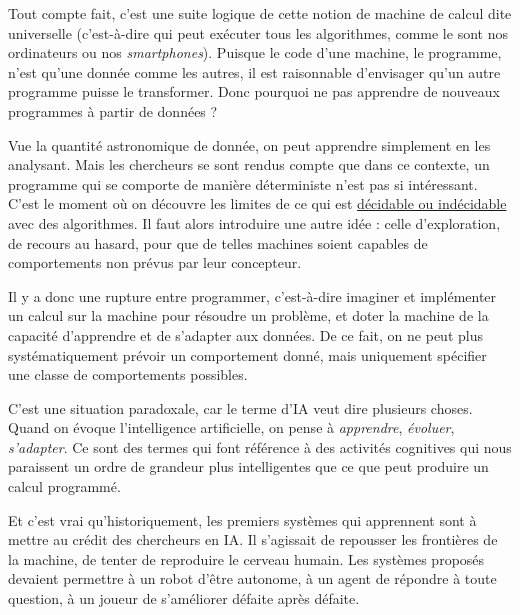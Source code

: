 %
Tout compte fait, c’est une suite logique de cette notion de machine de calcul dite universelle (c’est-à-dire qui peut exécuter tous les algorithmes, comme le sont nos ordinateurs ou nos \textit{smartphones}). Puisque le code d’une machine, le programme, n’est qu’une donnée comme les autres, il est raisonnable d’envisager qu’un autre programme puisse le transformer. Donc pourquoi ne pas apprendre de nouveaux program\-mes à partir de données ?

Vue la quantité astronomique de donnée, on peut apprendre simplement en les analysant. Mais les chercheurs se sont rendus compte que dans ce contexte, un programme qui se comporte de manière déterministe n’est pas si intéressant. C’est le moment où on découvre les limites de ce qui est \href{https://www.lemonde.fr/blog/binaire/2015/06/17/decidable-indecidable/}{décidable ou indécidable} avec des algorithmes. Il faut alors introduire une autre idée : celle d’exploration, de recours au hasard, pour que de telles machines soient capables de comportements non prévus par leur concepteur.

Il y a donc une rupture entre programmer, c’est-à-dire imaginer et implémenter un calcul sur la machine pour résoudre un problème, et doter la machine de la capacité d’apprendre et de s’adapter aux données. De ce fait, on ne peut plus systématiquement prévoir un comportement donné, mais uniquement spécifier une classe de comportements possibles.


C’est une situation paradoxale, car le terme d’IA veut dire plusieurs choses. Quand on évoque l’intelligence artificielle, on pense à \emph{appren\-dre}, \emph{évoluer}, \emph{s’adapter}. Ce sont des termes qui font référence à des activités cognitives qui nous paraissent un ordre de grandeur plus intelligentes que ce que peut produire un calcul programmé.

Et c’est vrai qu’historiquement, les premiers systèmes qui appren\-nent sont à mettre au crédit des chercheurs en IA. Il s’agissait de repousser les frontières de la machine, de tenter de reproduire le cerveau humain. Les systèmes proposés devaient permettre à un robot d’être autonome, à un agent de répondre à toute question, à un joueur de s’améliorer défaite après défaite.

